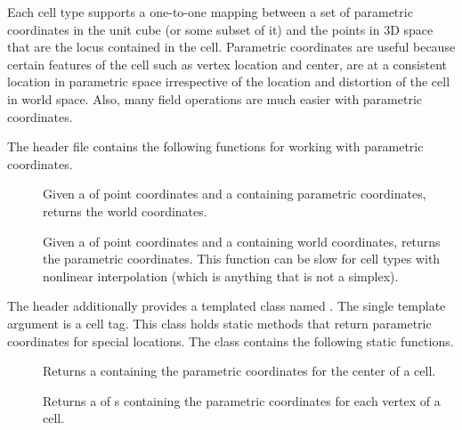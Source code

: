
Each cell type supports a one-to-one mapping between a set of parametric
coordinates in the unit cube (or some subset of it) and the points in 3D
space that are the locus contained in the cell. Parametric coordinates are
useful because certain features of the cell such as vertex location and
center, are at a consistent location in parametric space irrespective of
the location and distortion of the cell in world space. Also, many field
operations are much easier with parametric coordinates.

The  header file contains the
following functions for working with parametric coordinates.

\begin{description}
\item[] Given a
   of point coordinates and a 
  containing parametric coordinates, returns the world coordinates.
\item[] Given a
   of point coordinates and a 
  containing world coordinates, returns the parametric coordinates. This
  function can be slow for cell types with nonlinear interpolation (which
  is anything that is not a simplex).
\end{description}

The  header additionally
provides a templated class named . The
single template argument is a cell tag. This class holds static methods
that return parametric coordinates for special locations. The
 class contains the following static
functions.

\begin{description}
\item[] Returns a  containing the parametric
  coordinates for the center of a cell.
\item[] Returns a  of s
  containing the parametric coordinates for each vertex of a cell.
\end{description}


